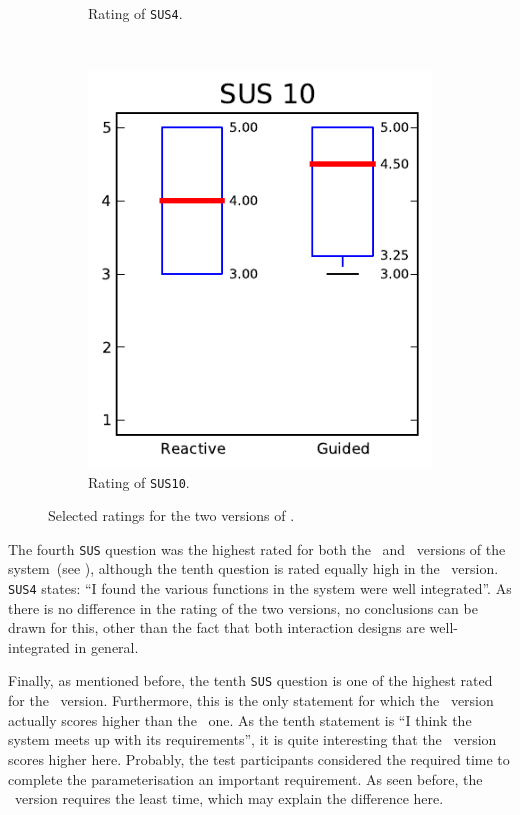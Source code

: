 \begin{figure}[h!]
\begin{subfigure}[t]{0.32\textwidth}
\caption{Rating of \texttt{SUS4}.}
\end{subfigure}%
~
\begin{subfigure}[t]{0.32\textwidth}
\centering
\includegraphics[width=\textwidth]{img/graphs/4a_09.pdf}
\caption{Rating of \texttt{SUS10}.}
\end{subfigure}
\caption{Selected ratings for the two versions of \oframp.}
\end{figure}

The fourth \verb|SUS| question was the highest rated for both the \IDa\ and \IDb\ versions of the system~(see ), although the tenth question is rated equally high in the \IDb\ version. \verb|SUS4| states: ``I found the various functions in the system were well integrated''. As there is no difference in the rating of the two versions, no conclusions can be drawn for this, other than the fact that both interaction designs are well-integrated in general.

Finally, as mentioned before, the tenth \verb|SUS| question is one of the highest rated for the \IDb\ version. Furthermore, this is the only statement for which the \IDb\ version actually scores higher than the \IDa\ one. As the tenth statement is ``I think the system meets up with its requirements'', it is quite interesting that the \IDb\ version scores higher here. Probably, the test participants considered the required time to complete the parameterisation an important requirement. As seen before, the \IDb\ version requires the least time, which may explain the difference here.


